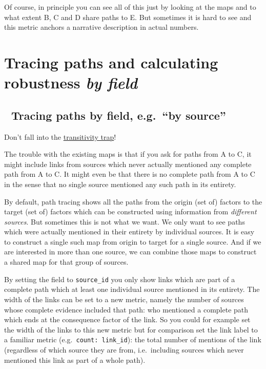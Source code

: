 \documentclass[
]{book}
\begin{document}
Of course, in principle you can see all of this just by looking at the maps and to what extent B, C and D share paths to E. But sometimes it is hard to see and this metric anchors a narrative description in actual numbers.

\hypertarget{xrobustness-by-field}{%
\section{\texorpdfstring{Tracing paths and calculating robustness \emph{by field}}{Tracing paths and calculating robustness by field}}\label{xrobustness-by-field}}

\hypertarget{tracing-paths-by-field-e.g.-by-source}{%
\subsection{🧪 Tracing paths by field, e.g.~``by source''}\label{tracing-paths-by-field-e.g.-by-source}}

Don't fall into the \protect\hyperlink{xtransitivity-trap}{transitivity trap}!

The trouble with the existing maps is that if you ask for paths from A to C, it might include links from sources which never actually mentioned any complete path from A to C. It might even be that there is no complete path from A to C in the sense that no single source mentioned any such path in its entirety.

By default, path tracing shows all the paths from the origin (set of) factors to the target (set of) factors which can be constructed using information from \emph{different sources}. But sometimes this is not what we want. We only want to see paths which were actually mentioned in their entirety by individual sources. It is easy to construct a single such map from origin to target for a single source. And if we are interested in more than one source, we can combine those maps to construct a shared map for that group of sources.

By setting the field to \texttt{source\_id} you only show links which are part of a complete path which at least one individual source mentioned in its entirety. The width of the links can be set to a new metric, namely the number of sources whose complete evidence included that path: who mentioned a complete path which ends at the consequence factor of the link. So you could for example set the width of the links to this new metric but for comparison set the link label to a familiar metric (e.g.~\texttt{count:\ link\_id}): the total number of mentions of the link (regardless of which source they are from, i.e.~including sources which never mentioned this link as part of a whole path).
\end{document}
